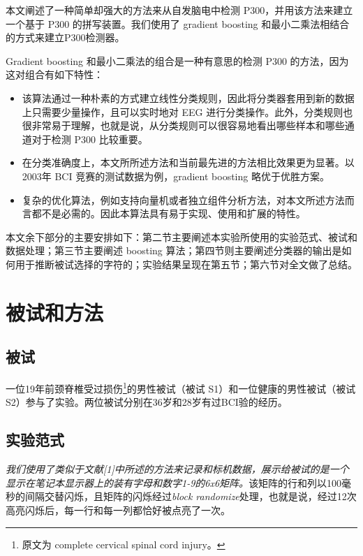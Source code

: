 \documentclass[a4paper]{ecust_thesis_translation}
\newcommand\unsure{\textit}
\begin{document}
  本文阐述了一种简单却强大的方法来从自发脑电中检测 P300，并用该方法来建立一个基于 P300 的拼写装置。我们使用了 gradient boosting 和最小二乘法相结合的方式来建立P300检测器。

  Gradient boosting 和最小二乘法的组合是一种有意思的检测 P300 的方法，因为这对组合有如下特性：

  \begin{itemize}
    \item 该算法通过一种朴素的方式建立线性分类规则，因此将分类器套用到新的数据上只需要少量操作，且可以实时地对 EEG 进行分类操作。此外，分类规则也很非常易于理解，也就是说，从分类规则可以很容易地看出哪些样本和哪些通道对于检测 P300 比较重要。
    \item 在分类准确度上，本文所所述方法和当前最先进的方法相比效果更为显著。以2003年 BCI 竞赛的测试数据为例，gradient boosting 略优于优胜方案。
    \item 复杂的优化算法，例如支持向量机或者独立组件分析方法，对本文所述方法而言都不是必需的。因此本算法具有易于实现、使用和扩展的特性。
  \end{itemize}

  本文余下部分的主要安排如下：第二节主要阐述本实验所使用的实验范式、被试和数据处理；第三节主要阐述 boosting 算法；第四节则主要阐述分类器的输出是如何用于推断被试选择的字符的；实验结果呈现在第五节；第六节对全文做了总结。

  \section{被试和方法}
  \subsection{被试}

  一位19年前颈脊椎受过损伤\footnote{原文为 complete cervical spinal cord injury。}的男性被试（被试 S1）和一位健康的男性被试（被试 S2）参与了实验。两位被试分别在36岁和28岁有过BCI验的经历。

  \subsection{实验范式}

  \unsure{我们使用了类似于文献[1]中所述的方法来记录和标机数据，展示给被试的是一个显示在笔记本显示器上的装有字母和数字1-9的6x6矩阵。}该矩阵的行和列以100毫秒的间隔交替闪烁，且矩阵的闪烁经过\unsure{block randomize}处理，也就是说，经过12次高亮闪烁后，每一行和每一列都恰好被点亮了一次。
\end{document}
